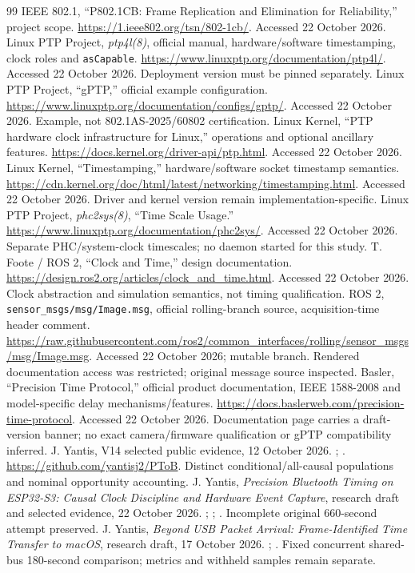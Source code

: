 \documentclass[11pt,letterpaper]{article}
\newcommand{\code}[1]{\texttt{#1}}
\begin{document}
\begin{thebibliography}{99}
 IEEE 802.1, ``P802.1CB: Frame Replication and Elimination for Reliability,'' project scope. \url{https://1.ieee802.org/tsn/802-1cb/}. Accessed 22 October 2026.
 Linux PTP Project, \emph{ptp4l(8)}, official manual, hardware/software timestamping, clock roles and \code{asCapable}. \url{https://www.linuxptp.org/documentation/ptp4l/}. Accessed 22 October 2026. Deployment version must be pinned separately.
 Linux PTP Project, ``gPTP,'' official example configuration. \url{https://www.linuxptp.org/documentation/configs/gptp/}. Accessed 22 October 2026. Example, not 802.1AS-2025/60802 certification.
 Linux Kernel, ``PTP hardware clock infrastructure for Linux,'' operations and optional ancillary features. \url{https://docs.kernel.org/driver-api/ptp.html}. Accessed 22 October 2026.
 Linux Kernel, ``Timestamping,'' hardware/software socket timestamp semantics. \url{https://cdn.kernel.org/doc/html/latest/networking/timestamping.html}. Accessed 22 October 2026. Driver and kernel version remain implementation-specific.
 Linux PTP Project, \emph{phc2sys(8)}, ``Time Scale Usage.'' \url{https://www.linuxptp.org/documentation/phc2sys/}. Accessed 22 October 2026. Separate PHC/system-clock timescales; no daemon started for this study.
 T. Foote / ROS 2, ``Clock and Time,'' design documentation. \url{https://design.ros2.org/articles/clock_and_time.html}. Accessed 22 October 2026. Clock abstraction and simulation semantics, not timing qualification.
 ROS 2, \code{sensor\_msgs/msg/Image.msg}, official rolling-branch source, acquisition-time header comment. \url{https://raw.githubusercontent.com/ros2/common_interfaces/rolling/sensor_msgs/msg/Image.msg}. Accessed 22 October 2026; mutable branch. Rendered documentation access was restricted; original message source inspected.
 Basler, ``Precision Time Protocol,'' official product documentation, IEEE 1588-2008 and model-specific delay mechanisms/features. \url{https://docs.baslerweb.com/precision-time-protocol}. Accessed 22 October 2026. Documentation page carries a draft-version banner; no exact camera/firmware qualification or gPTP compatibility inferred.
 J. Yantis, V14 selected public evidence, 12 October 2026. ; . \url{https://github.com/yantisj2/PToB}. Distinct conditional/all-causal populations and nominal opportunity accounting.
 J. Yantis, \emph{Precision Bluetooth Timing on ESP32-S3: Causal Clock Discipline and Hardware Event Capture}, research draft and selected evidence, 22 October 2026. ; ; . Incomplete original 660-second attempt preserved.
 J. Yantis, \emph{Beyond USB Packet Arrival: Frame-Identified Time Transfer to macOS}, research draft, 17 October 2026. ; . Fixed concurrent shared-bus 180-second comparison; metrics and withheld samples remain separate.
\end{thebibliography}
\end{document}
